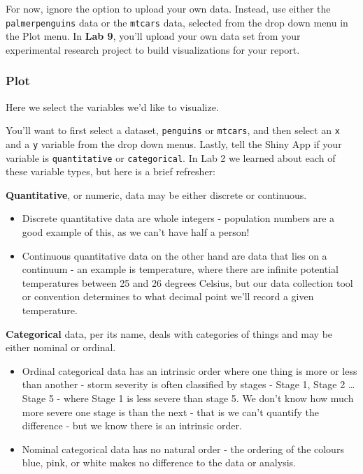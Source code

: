 \documentclass[
]{book}
\providecommand{\tightlist}{%
  \setlength{\itemsep}{0pt}\setlength{\parskip}{0pt}}
\begin{document}
For now, ignore the option to upload your own data. Instead, use either the \texttt{palmerpenguins} data or the \texttt{mtcars} data, selected from the drop down menu in the Plot menu. In \textbf{Lab 9}, you'll upload your own data set from your experimental research project to build visualizations for your report.

\hypertarget{plot}{%
\subsubsection*{Plot}\label{plot}}

Here we select the variables we'd like to visualize.

You'll want to first select a dataset, \texttt{penguins} or \texttt{mtcars}, and then select an \texttt{x} and a \texttt{y} variable from the drop down menus. Lastly, tell the Shiny App if your variable is \texttt{quantitative} or \texttt{categorical}. In Lab 2 we learned about each of these variable types, but here is a brief refresher:

\textbf{Quantitative}, or numeric, data may be either discrete or continuous.

\begin{itemize}
\tightlist
\item
  Discrete quantitative data are whole integers - population numbers are a good example of this, as we can't have half a person!
\item
  Continuous quantitative data on the other hand are data that lies on a continuum - an example is temperature, where there are infinite potential temperatures between 25 and 26 degrees Celsius, but our data collection tool or convention determines to what decimal point we'll record a given temperature.
\end{itemize}

\textbf{Categorical} data, per its name, deals with categories of things and may be either nominal or ordinal.

\begin{itemize}
\tightlist
\item
  Ordinal categorical data has an intrinsic order where one thing is more or less than another - storm severity is often classified by stages - Stage 1, Stage 2 \ldots{} Stage 5 - where Stage 1 is less severe than stage 5. We don't know how much more severe one stage is than the next - that is we can't quantify the difference - but we know there is an intrinsic order.
\item
  Nominal categorical data has no natural order - the ordering of the colours blue, pink, or white makes no difference to the data or analysis.
\end{itemize}
\end{document}
